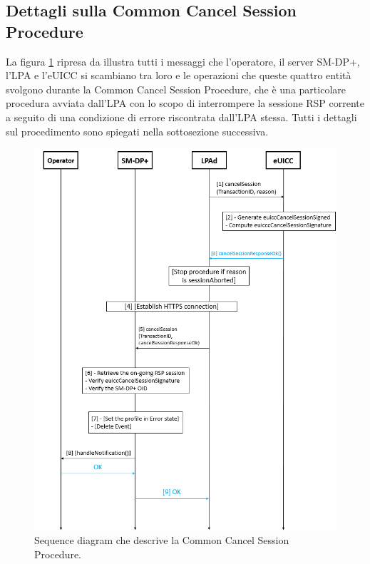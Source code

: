 \documentclass[10pt, oneside]{book}
\begin{document}
\subsection{Dettagli sulla Common Cancel Session Procedure}\label{sec:common-cancel-session}
La figura  \ref{fig:common-cancel-session} ripresa da \cite{GSMA-docs-new} illustra tutti i messaggi che l'operatore, il server SM-DP+, l'LPA e l'eUICC si scambiano tra loro e le operazioni che queste quattro entità svolgono durante la Common Cancel Session Procedure, che è una particolare procedura avviata dall'LPA con lo scopo di interrompere la sessione RSP corrente a seguito di una condizione di errore riscontrata dall'LPA stessa. Tutti i dettagli sul procedimento \cite{GSMA-docs-new} sono spiegati nella sottosezione successiva.
\begin{figure}
\includegraphics[width=\linewidth]{common-cancel-session.png}
\caption{Sequence diagram che descrive la Common Cancel Session Procedure.}
\label{fig:common-cancel-session}
\end{figure}
\end{document}
